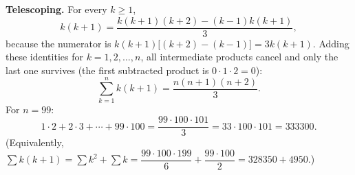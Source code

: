 \textbf{Telescoping.} For every $k\ge1$,
\[
k(k+1)=\dfrac{k(k+1)(k+2)-(k-1)k(k+1)}{3},
\]
because the numerator is $k(k+1)\bigl[(k+2)-(k-1)\bigr]=3k(k+1)$. Adding these identities for $k=1,2,\dots,n$, all intermediate products cancel and only the last one survives (the first subtracted product is $0\cdot1\cdot2=0$):
\[
\sum_{k=1}^{n}k(k+1)=\dfrac{n(n+1)(n+2)}{3}.
\]
For $n=99$:
\[
1\cdot2+2\cdot3+\cdots+99\cdot100=\dfrac{99\cdot100\cdot101}{3}=33\cdot100\cdot101=\boxed{333300}.
\]
(Equivalently, $\sum k(k+1)=\sum k^2+\sum k=\dfrac{99\cdot100\cdot199}{6}+\dfrac{99\cdot100}{2}=328350+4950$.)
